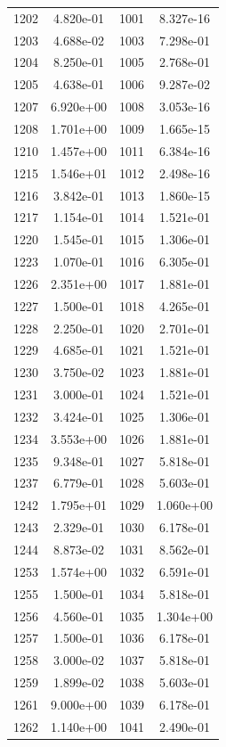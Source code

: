 \documentclass[12pt]{article}
\begin{document}
\begin{longtable}{@{}cccc@{}}
1202 & 4.820e-01 & 1001 & 8.327e-16 \\
1203 & 4.688e-02 & 1003 & 7.298e-01 \\
1204 & 8.250e-01 & 1005 & 2.768e-01 \\
1205 & 4.638e-01 & 1006 & 9.287e-02 \\
1207 & 6.920e+00 & 1008 & 3.053e-16 \\
1208 & 1.701e+00 & 1009 & 1.665e-15 \\
1210 & 1.457e+00 & 1011 & 6.384e-16 \\
1215 & 1.546e+01 & 1012 & 2.498e-16 \\
1216 & 3.842e-01 & 1013 & 1.860e-15 \\
1217 & 1.154e-01 & 1014 & 1.521e-01 \\
1220 & 1.545e-01 & 1015 & 1.306e-01 \\
1223 & 1.070e-01 & 1016 & 6.305e-01 \\
1226 & 2.351e+00 & 1017 & 1.881e-01 \\
1227 & 1.500e-01 & 1018 & 4.265e-01 \\
1228 & 2.250e-01 & 1020 & 2.701e-01 \\
1229 & 4.685e-01 & 1021 & 1.521e-01 \\
1230 & 3.750e-02 & 1023 & 1.881e-01 \\
1231 & 3.000e-01 & 1024 & 1.521e-01 \\
1232 & 3.424e-01 & 1025 & 1.306e-01 \\
1234 & 3.553e+00 & 1026 & 1.881e-01 \\
1235 & 9.348e-01 & 1027 & 5.818e-01 \\
1237 & 6.779e-01 & 1028 & 5.603e-01 \\
1242 & 1.795e+01 & 1029 & 1.060e+00 \\
1243 & 2.329e-01 & 1030 & 6.178e-01 \\
1244 & 8.873e-02 & 1031 & 8.562e-01 \\
1253 & 1.574e+00 & 1032 & 6.591e-01 \\
1255 & 1.500e-01 & 1034 & 5.818e-01 \\
1256 & 4.560e-01 & 1035 & 1.304e+00 \\
1257 & 1.500e-01 & 1036 & 6.178e-01 \\
1258 & 3.000e-02 & 1037 & 5.818e-01 \\
1259 & 1.899e-02 & 1038 & 5.603e-01 \\
1261 & 9.000e+00 & 1039 & 6.178e-01 \\
1262 & 1.140e+00 & 1041 & 2.490e-01 \\

\end{longtable}
\end{document}
